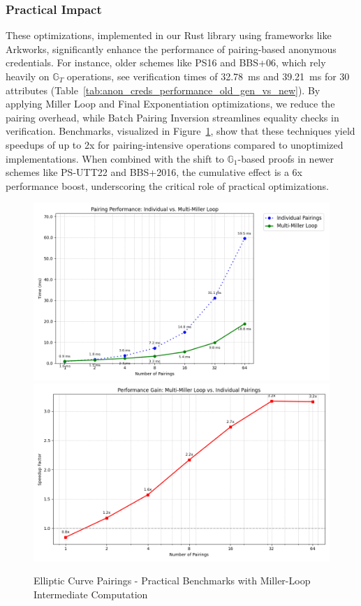 \subsubsection*{Practical Impact}
These optimizations, implemented in our Rust library using frameworks like Arkworks, significantly enhance the performance of pairing-based anonymous credentials. For instance, older schemes like PS16 and BBS+06, which rely heavily on $\mathbb{G}_T$ operations, see verification times of 32.78~ms and 39.21~ms for 30 attributes (Table~\ref{tab:anon_creds_performance_old_gen_vs_new}). By applying Miller Loop and Final Exponentiation optimizations, we reduce the pairing overhead, while Batch Pairing Inversion streamlines equality checks in verification. Benchmarks, visualized in Figure~\ref{fig:elliptic_curve_pairings_speedup}, show that these techniques yield speedups of up to 2x for pairing-intensive operations compared to unoptimized implementations. When combined with the shift to $\mathbb{G}_1$-based proofs in newer schemes like PS-UTT22 and BBS+2016, the cumulative effect is a 6x performance boost, underscoring the critical role of practical optimizations.

\begin{figure}[!htb]
    \centering
    \includegraphics[width=0.75\linewidth]{pairing_comparison.png}
    \includegraphics[width=0.75\linewidth]{pairing_comparison2.png}
    \caption{Elliptic Curve Pairings - Practical Benchmarks with Miller-Loop Intermediate Computation}
    \label{fig:elliptic_curve_pairings_speedup}
\end{figure}




